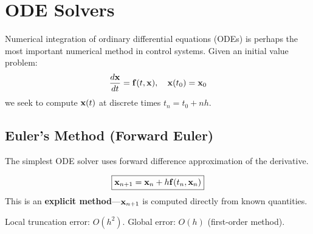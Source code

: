 \section{ODE Solvers}
\label{sec:ode_solvers}

Numerical integration of ordinary differential equations (ODEs) is perhaps the most important numerical method in control systems. Given an initial value problem:
\begin{equation}
\frac{d\mathbf{x}}{dt} = \mathbf{f}(t, \mathbf{x}), \quad \mathbf{x}(t_0) = \mathbf{x}_0
\end{equation}
we seek to compute $\mathbf{x}(t)$ at discrete times $t_n = t_0 + nh$.



\subsection{Euler's Method (Forward Euler)}

The simplest ODE solver uses forward difference approximation of the derivative.

\begin{definitionbox}[title=Definition 11.10: Forward Euler Method]
\begin{equation}
\boxed{\mathbf{x}_{n+1} = \mathbf{x}_n + h\mathbf{f}(t_n, \mathbf{x}_n)}
\end{equation}
This is an \textbf{explicit method}---$\mathbf{x}_{n+1}$ is computed directly from known quantities.

Local truncation error: $O(h^2)$. Global error: $O(h)$ (first-order method).
\end{definitionbox}

